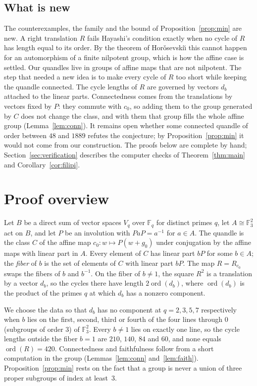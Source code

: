 \documentclass[11pt]{article}
\newcommand{\F}{\mathbb{F}}
\begin{document}
\subsection{What is new}

The counterexamples, the family and the bound of
Proposition~\ref{prop:min} are new. A right translation $R$ fails
Hayashi's condition exactly when no cycle of $R$ has length equal to its
order. By the theorem of Hor\v{o}sevski\u{\i} this cannot happen for an
automorphism of a finite nilpotent group, which is how the affine case is
settled. Our quandles live in groups of affine maps that are not
nilpotent. The step that needed a new idea is to make every cycle of $R$
too short while keeping the quandle connected. The cycle lengths of $R$ are
governed by vectors $d_b$ attached to the linear parts. Connectedness comes
from the translations by vectors fixed by $P$: they commute with $c_0$, so
adding them to the group generated by $C$ does not change the class, and
with them that group fills the whole affine group (Lemma~\ref{lem:conn}).
It remains open whether some connected quandle of order between $48$ and
$1889$ refutes the conjecture; by Proposition~\ref{prop:min} it would not
come from our construction. The proofs below are complete by hand;
Section~\ref{sec:verification} describes the computer checks of
Theorem~\ref{thm:main} and Corollary~\ref{cor:filipi}.

\section{Proof overview}

Let $B$ be a direct sum of vector spaces $V_q$ over $\F_q$ for distinct
primes $q$, let $A\cong\F_3^2$ act on $B$, and let $P$ be an involution
with $PaP=a^{-1}$ for $a\in A$. The quandle is the class $C$ of the affine
map $c_0\colon w\mapsto P(w+g_0)$ under conjugation by the affine maps with
linear part in $A$. Every element of $C$ has linear part $bP$ for some
$b\in A$; the \emph{fiber} of $b$ is the set of elements of $C$ with linear
part $bP$. The map $R=R_{c_0}$ swaps the fibers of $b$ and $b^{-1}$. On the
fiber of $b\ne1$, the square $R^2$ is a translation by a vector $d_b$, so
the cycles there have length $2\operatorname{ord}(d_b)$, where
$\operatorname{ord}(d_b)$ is the product of the primes $q$ at which $d_b$
has a nonzero component.

We choose the data so that $d_b$ has no component at $q=2,3,5,7$
respectively when $b$ lies on the first, second, third or fourth of the
four lines through $0$ (subgroups of order $3$) of $\F_3^2$. Every $b\ne1$
lies on exactly one line, so the cycle lengths outside the fiber $b=1$ are
$210$, $140$, $84$ and $60$, and none equals $\operatorname{ord}(R)=420$.
Connectedness and faithfulness follow from a short computation in the
group (Lemmas~\ref{lem:conn} and~\ref{lem:faith}).
Proposition~\ref{prop:min} rests on the fact that a group is never a union
of three proper subgroups of index at least~$3$.
\end{document}
